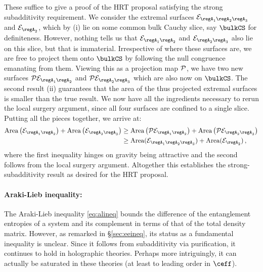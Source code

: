 \documentclass[12pt,openany]{book}
\begin{document}
These suffice to give a proof of the HRT proposal satisfying the strong subadditivity requirement. We  consider the extremal surfaces ${\cal E}_{\regA_1\regA_2\regA_3}$ and ${\cal E}_{\regA_2}$, which by (i) lie on some common bulk Cauchy slice, say $\bulkCS$ for definiteness. However, nothing tells us that ${\cal E}_{\regA_1\regA_2}$ and ${\cal E}_{\regA_2\regA_3}$ also lie on this slice, but that is immaterial. Irrespective of where these surfaces are, we are free to project them onto $\bulkCS$ by following the null congruence emanating from them. Viewing this as a projection map ${\cal P}$, we have two new surfaces
${\cal P} {\cal E}_{\regA_1 \regA_2}$ and ${\cal P}{\cal E}_{\regA_2 \regA_3}$ which are also now on $\bulkCS$. The second result (ii) guarantees  that the area of the thus projected extremal surfaces is smaller than the true result. We now have all the ingredients necessary to rerun the local surgery argument, since all four surfaces are confined to a single slice. Putting all the pieces together, we arrive at:
%
\begin{equation}
\begin{split}
\text{Area}\left({\cal E}_{\regA_1 \regA_2}\right) + \text{Area} \left({\cal E}_{\regA_2\regA_3}\right)
& \geq \text{Area}\left({\cal P}{\cal E}_{\regA_1 \regA_2}\right) + \text{Area} \left({\cal P}{\cal E}_{\regA_2\regA_3}\right)
\\
& \geq \text{Area}({\cal E}_{\regA_1 \regA_2 \regA_3}) + \text{Area}({\cal E}_{\regA_2}) \,,
\label{}
\end{split}
\end{equation}
%
where the first inequality hinges on gravity being attractive and the second follows from the local surgery argument. Altogether this establishes the strong-subadditivity result as desired for the HRT proposal.


\paragraph{Araki-Lieb inequality:} The Araki-Lieb inequality \eqref{eq:alineq} bounds the difference of the entanglement entropies of a system and its complement in terms of that of the total density matrix. However, as remarked in \S\ref{sec:eeineq}, its status as a fundamental inequality is unclear. Since it follows from subadditivity via purification, it continues to hold in holographic theories.  Perhaps more intriguingly, it can actually be saturated in these theories (at least to leading order in $\ceff$).
\end{document}
